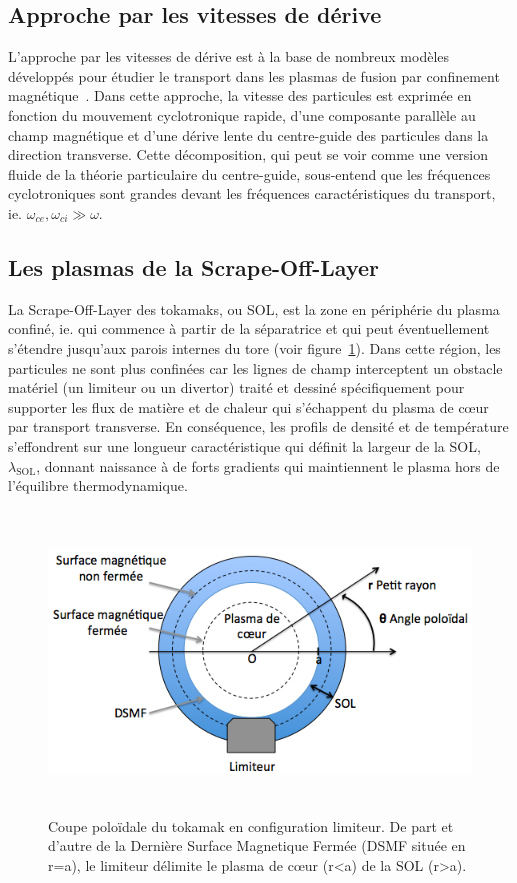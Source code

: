 \begin{refsection}
\section{Approche par les vitesses de dérive}
\label{vitessesDerive}
L'approche par les vitesses de dérive est à la base de nombreux modèles
développés pour étudier le transport dans les plasmas de fusion par
confinement magnétique~\parencite{Garcia,Bisai,Tamain}. Dans cette approche, la
vitesse des particules est exprimée en fonction du mouvement cyclotronique rapide, d'une composante
parallèle au champ magnétique et d'une dérive lente du centre-guide des particules dans
la direction transverse. Cette décomposition, qui peut se voir comme une
version fluide de la théorie particulaire du centre-guide, sous-entend que les
fréquences cyclotroniques sont grandes devant les fréquences caractéristiques du
transport, ie. $\omega_{ce},\omega_{ci}\gg\omega$. 
 
\subsection{Les plasmas de la Scrape-Off-Layer}
La Scrape-Off-Layer des tokamaks, ou SOL, est la zone en
périphérie du plasma confiné, ie. qui commence à partir de la séparatrice et qui
peut éventuellement s'étendre jusqu'aux parois internes du tore (voir
figure~\ref{SOL}). Dans cette région, les
particules ne sont plus confinées car les lignes de champ interceptent un
obstacle matériel (un limiteur ou un divertor) traité et dessiné spécifiquement
pour supporter les flux de matière et de chaleur qui s'échappent du plasma de
c\oe ur par transport transverse.
En conséquence, les profils de densité et de température s'effondrent sur une
longueur caractéristique qui définit la largeur de la SOL, $\lambda_\text{SOL}$,
donnant naissance à de forts gradients qui maintiennent le plasma hors
de l'équilibre thermodynamique.

\begin{figure}[!htbp]
    \centering
	\includegraphics[height=80mm]{figures/1-SOLLimiter.png}
	\caption{Coupe poloïdale du tokamak en configuration limiteur. De part et
	d'autre de la Dernière Surface Magnetique Fermée (DSMF située en r=a), le
	limiteur délimite le plasma de c\oe ur (r<a) de la SOL (r>a).}\label{SOL}
\end{figure}
 

\end{refsection}
